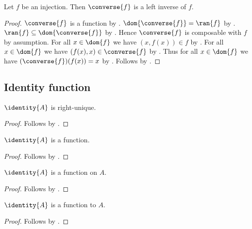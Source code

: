 \begin{proposition}\label{injective_converse_is_leftinverse}
    Let $f$ be an injection.
    Then $\converse{f}$ is a left inverse of $f$.
\end{proposition}
\begin{proof}
    $\converse{f}$ is a function by .
    $\dom{\converse{f}}=\ran{f}$ by .
    $\ran{f}\subseteq\dom{\converse{f}}$
        by .
    Hence $\converse{f}$ is composable with $f$ by assumption.
    For all $x\in\dom{f}$ we have $(x,f(x))\in f$
        by .
    For all $x\in\dom{f}$ we have $(f(x),x)\in\converse{f}$
        by .
    Thus for all $x\in\dom{f}$ we have $(\converse{f})(f(x))=x$
        by .
    Follows by .
\end{proof}



\subsection{Identity function}

\begin{proposition}\label{id_rightunique}
    $\identity{A}$ is right-unique.
\end{proposition}
\begin{proof}
    Follows by .
\end{proof}

\begin{proposition}\label{id_is_function}
    $\identity{A}$ is a function.
\end{proposition}
\begin{proof}
    Follows by .
\end{proof}

\begin{proposition}\label{id_is_function_on}
    $\identity{A}$ is a function on $A$.
\end{proposition}
\begin{proof}
    Follows by .
\end{proof}

\begin{proposition}\label{id_is_function_to}
    $\identity{A}$ is a function to $A$.
\end{proposition}
\begin{proof}
    Follows by .
\end{proof}

